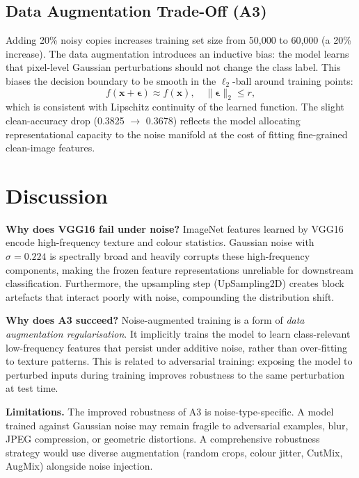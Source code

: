 \documentclass[12pt,a4paper]{article}
\begin{document}
\subsection{Data Augmentation Trade-Off (A3)}

Adding 20\% noisy copies increases training set size from 50{,}000 to 60{,}000 (a 20\% increase). The data augmentation introduces an inductive bias: the model learns that pixel-level Gaussian perturbations should not change the class label. This biases the decision boundary to be smooth in the $\ell_2$-ball around training points:
\begin{equation}
    f(\mathbf{x} + \boldsymbol{\epsilon}) \approx f(\mathbf{x}), \quad \|\boldsymbol{\epsilon}\|_2 \leq r,
\end{equation}
which is consistent with Lipschitz continuity of the learned function. The slight clean-accuracy drop (0.3825 $\to$ 0.3678) reflects the model allocating representational capacity to the noise manifold at the cost of fitting fine-grained clean-image features.

\section{Discussion}

\textbf{Why does VGG16 fail under noise?} ImageNet features learned by VGG16 encode high-frequency texture and colour statistics. Gaussian noise with $\sigma = 0.224$ is spectrally broad and heavily corrupts these high-frequency components, making the frozen feature representations unreliable for downstream classification. Furthermore, the upsampling step (UpSampling2D) creates block artefacts that interact poorly with noise, compounding the distribution shift.

\textbf{Why does A3 succeed?} Noise-augmented training is a form of \emph{data augmentation regularisation}. It implicitly trains the model to learn class-relevant low-frequency features that persist under additive noise, rather than over-fitting to texture patterns. This is related to adversarial training: exposing the model to perturbed inputs during training improves robustness to the same perturbation at test time.

\textbf{Limitations.} The improved robustness of A3 is noise-type-specific. A model trained against Gaussian noise may remain fragile to adversarial examples, blur, JPEG compression, or geometric distortions. A comprehensive robustness strategy would use diverse augmentation (random crops, colour jitter, CutMix, AugMix) alongside noise injection.
\end{document}
